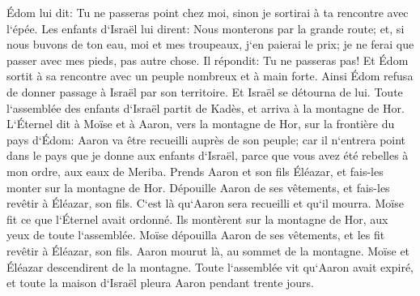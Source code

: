 \verse Édom lui dit: Tu ne passeras point chez moi, sinon je sortirai à ta rencontre avec l`épée. 
\verse Les enfants d`Israël lui dirent: Nous monterons par la grande route; et, si nous buvons de ton eau, moi et mes troupeaux, j`en paierai le prix; je ne ferai que passer avec mes pieds, pas autre chose. 
\verse Il répondit: Tu ne passeras pas! Et Édom sortit à sa rencontre avec un peuple nombreux et à main forte. 
\verse Ainsi Édom refusa de donner passage à Israël par son territoire. Et Israël se détourna de lui. 
\verse Toute l`assemblée des enfants d`Israël partit de Kadès, et arriva à la montagne de Hor. 
\verse L`Éternel dit à Moïse et à Aaron, vers la montagne de Hor, sur la frontière du pays d`Édom: 
\verse Aaron va être recueilli auprès de son peuple; car il n`entrera point dans le pays que je donne aux enfants d`Israël, parce que vous avez été rebelles à mon ordre, aux eaux de Meriba. 
\verse Prends Aaron et son fils Éléazar, et fais-les monter sur la montagne de Hor. 
\verse Dépouille Aaron de ses vêtements, et fais-les revêtir à Éléazar, son fils. C`est là qu`Aaron sera recueilli et qu`il mourra. 
\verse Moïse fit ce que l`Éternel avait ordonné. Ils montèrent sur la montagne de Hor, aux yeux de toute l`assemblée. 
\verse Moïse dépouilla Aaron de ses vêtements, et les fit revêtir à Éléazar, son fils. Aaron mourut là, au sommet de la montagne. Moïse et Éléazar descendirent de la montagne. 
\verse Toute l`assemblée vit qu`Aaron avait expiré, et toute la maison d`Israël pleura Aaron pendant trente jours. 

